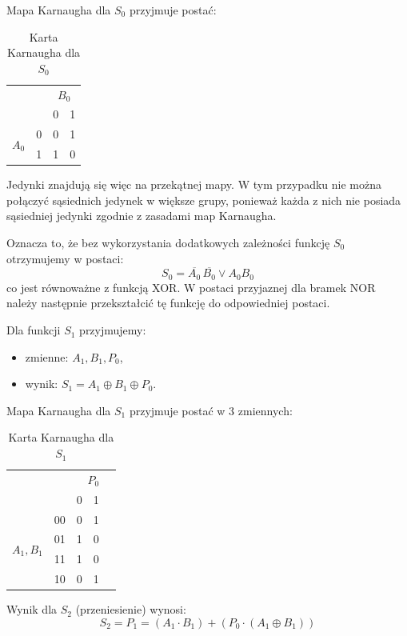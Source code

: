 \documentclass[11pt]{article}
\begin{document}
Mapa Karnaugha dla \(S_0\) przyjmuje postać:
\begin{table}[h]
\centering
\caption{Karta Karnaugha dla \(S_0\)}
\begin{tabular}{cc|c|c}
\multicolumn{2}{c}{} & \multicolumn{2}{c}{\(B_0\)} \\
\multicolumn{2}{c}{} & 0 & 1 \\
\hline
\multirow{2}{*}{\(A_0\)} & 0 & 0 & 1 \\
\cline{2-4}
 & 1 & 1 & 0 \\
\end{tabular}
\end{table}

Jedynki znajdują się więc na przekątnej mapy. W tym przypadku nie można połączyć sąsiednich jedynek w większe grupy, ponieważ każda z nich nie posiada sąsiedniej jedynki zgodnie z zasadami map Karnaugha.

Oznacza to, że bez wykorzystania dodatkowych zależności funkcję \(S_0\) otrzymujemy w postaci:
\begin{equation}
S_0 = \overline{A_0}\,\overline{B_0} \lor A_0 B_0
\end{equation}
co jest równoważne z funkcją XOR. W postaci przyjaznej dla bramek NOR należy następnie przekształcić tę funkcję do odpowiedniej postaci.

Dla funkcji \(S_1\) przyjmujemy:
\begin{itemize}
    \item zmienne: \(A_1, B_1, P_0\),
    \item wynik: \(S_1 = A_1 \oplus B_1 \oplus P_0\).
\end{itemize}

Mapa Karnaugha dla \(S_1\) przyjmuje postać w 3 zmiennych:
\begin{table}[h]
\centering
\caption{Karta Karnaugha dla \(S_1\)}
\begin{tabular}{cc|c|c|c}
\multicolumn{2}{c}{} & \multicolumn{3}{c}{\(P_0\)} \\
\multicolumn{2}{c}{} & 0 & 1 \\
\hline
\multirow{4}{*}{\(A_1,B_1\)} & 00 & 0 & 1 \\
\cline{2-4}
 & 01 & 1 & 0 \\
\cline{2-4}
 & 11 & 1 & 0 \\
\cline{2-4}
 & 10 & 0 & 1 \\
\end{tabular}
\end{table}

Wynik dla \(S_2\) (przeniesienie) wynosi:
\begin{equation}
S_2 = P_1 = (A_1 \cdot B_1) + (P_0 \cdot (A_1 \oplus B_1))
\end{equation}
\end{document}
